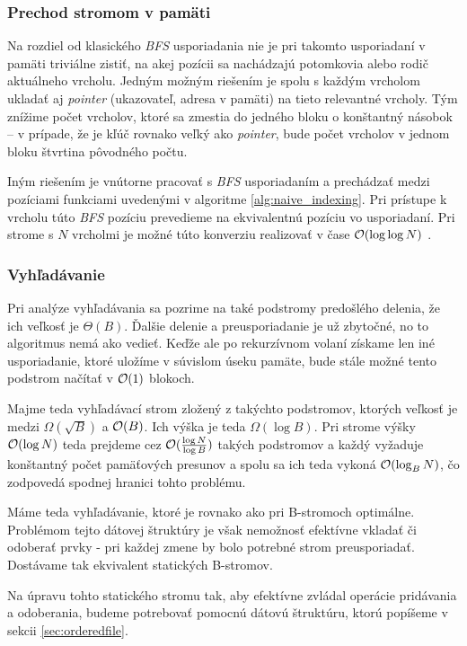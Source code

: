 \subsubsection{Prechod stromom v pamäti}
Na rozdiel od klasického \emph{BFS} usporiadania nie je pri takomto usporiadaní v pamäti triviálne zistiť, na akej pozícii sa nachádzajú potomkovia alebo rodič aktuálneho vrcholu. Jedným možným riešením je spolu s každým vrcholom ukladať aj \emph{pointer} (ukazovateľ, adresa v pamäti) na tieto relevantné vrcholy. Tým znížime počet vrcholov, ktoré sa zmestia do jedného bloku o konštantný násobok -- v prípade, že je kľúč rovnako veľký ako \emph{pointer}, bude počet vrcholov v jednom bloku štvrtina pôvodného počtu.

Iným riešením je vnútorne pracovať s \emph{BFS} usporiadaním a prechádzať medzi pozíciami funkciami uvedenými v algoritme \ref{alg:naive_indexing}. Pri prístupe k vrcholu túto \emph{BFS} pozíciu prevedieme na ekvivalentnú pozíciu vo \vEB usporiadaní. Pri strome s $N$ vrcholmi je možné túto konverziu realizovať v čase $\mathcal{O}(\log\log N)$ \citep{kasheff2004cache}.

\subsubsection{Vyhľadávanie} \label{sec:static-search}

Pri analýze vyhľadávania sa pozrime na také podstromy predošlého delenia, že ich veľkosť je $\Theta(B)$. Ďalšie delenie a preusporiadanie je už zbytočné, no to \obliv algoritmus nemá ako vedieť. Keďže ale po rekurzívnom volaní získame len iné usporiadanie, ktoré uložíme v súvislom úseku pamäte, bude stále možné tento podstrom načítať v $\mathcal{O}(1)$ blokoch.

Majme teda vyhľadávací strom zložený z takýchto podstromov, ktorých veľkosť je medzi $\Omega(\sqrt{B})$ a $\mathcal{O}(B)$. Ich výška je teda $\Omega(\log{B})$. Pri strome výšky $\mathcal{O}(\log N)$ teda prejdeme cez $\mathcal{O}(\frac{\log{N}}{\log{B}})$ takých podstromov a každý vyžaduje konštantný počet pamäťových presunov a spolu sa ich teda vykoná $\mathcal{O}(\log_B{N})$, čo zodpovedá spodnej hranici tohto problému.

Máme teda vyhľadávanie, ktoré je rovnako ako pri \aware B-stromoch optimálne. Problémom tejto dátovej štruktúry je však nemožnosť efektívne vkladať či odoberať prvky - pri každej zmene by bolo potrebné strom preusporiadať. Dostávame tak \obliv ekvivalent statických \aware B-stromov. 

Na úpravu tohto statického stromu tak, aby efektívne zvládal operácie pridávania a odoberania, budeme potrebovať pomocnú dátovú štruktúru, ktorú popíšeme v sekcii \ref{sec:orderedfile}.

